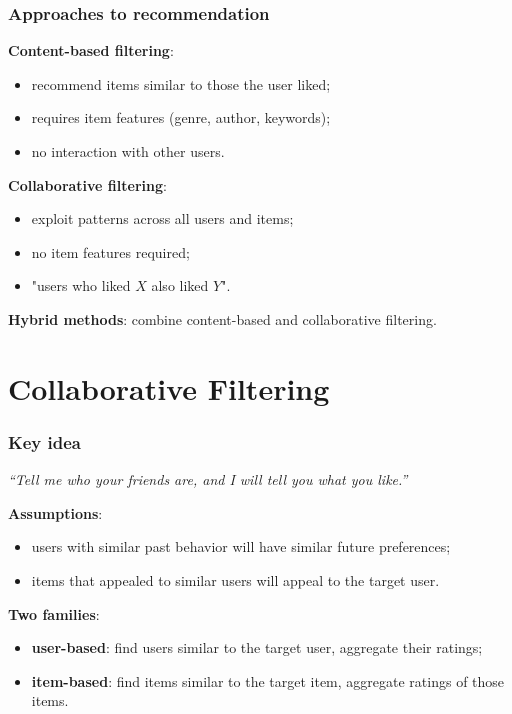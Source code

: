 \documentclass[]{beamer}
\begin{document}
\begin{frame}[fragile]
\frametitle{Approaches to recommendation}
\textbf{Content-based filtering}:
\begin{itemize}
  \item recommend items similar to those the user liked;
  \item requires item features (genre, author, keywords);
  \item no interaction with other users.
\end{itemize}

\textbf{Collaborative filtering}:
\begin{itemize}
  \item exploit patterns across all users and items;
  \item no item features required;
  \item "users who liked $X$ also liked $Y$".
\end{itemize}

\textbf{Hybrid methods}: combine content-based and collaborative filtering.

\end{frame}

\section{Collaborative Filtering}

\begin{frame}[fragile]
\frametitle{Key idea}
\begin{center}
\textit{``Tell me who your friends are, and I will tell you what you like.''}
\end{center}

\vspace{4mm}

\textbf{Assumptions}:
\begin{itemize}
  \item users with similar past behavior will have similar future preferences;
  \item items that appealed to similar users will appeal to the target user.
\end{itemize}

\textbf{Two families}:
\begin{itemize}
  \item \textbf{user-based}: find users similar to the target user, aggregate their ratings;
  \item \textbf{item-based}: find items similar to the target item, aggregate ratings of those items.
\end{itemize}

\end{frame}
\end{document}
